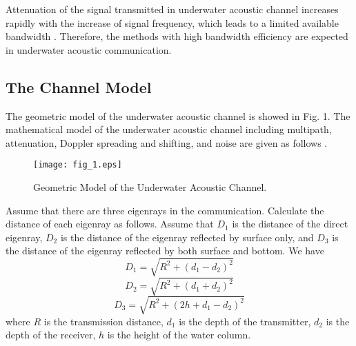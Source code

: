 \documentclass[journal]{IEEEtran}
\begin{document}
Attenuation of the signal transmitted in underwater acoustic channel
increases rapidly with the increase of signal frequency, which leads
to a limited available bandwidth \cite{Stojanovic2009}. Therefore,
the methods with high bandwidth efficiency are expected in
underwater acoustic communication.
\subsection{The Channel Model}
The geometric model of the underwater acoustic channel is showed in
Fig. 1. The mathematical model of the underwater acoustic channel
including multipath, attenuation, Doppler spreading and shifting,
and noise are given as follows \cite{Chitre2007}.
\begin{figure}[!t]
\centering
\texttt{[image: fig\_1.eps]}
\caption{Geometric Model of the Underwater Acoustic Channel.}
\label{fig_sim}
\end{figure}

Assume that there are three eigenrays in the communication.
Calculate the distance of each eigenray as follows. Assume that
${D_1}$ is the distance of the direct eigenray, ${D_2}$ is the
distance of the eigenray reflected by surface only, and ${D_3}$ is
the distance of the eigenray reflected by both surface and bottom.
We have
\begin{equation}
\label{eqn_example} {D_1} = \sqrt {{R^2} + {{({d_1} - {d_2})}^2}}
\end{equation}
\begin{equation}
\label{eqn_example} {D_2} = \sqrt {{R^2} + {{({d_1} + {d_2})}^2}}
\end{equation}
\begin{equation}
\label{eqn_example} {D_3} = \sqrt {{R^2} + {{(2h + {d_1} -
{d_2})}^2}}
\end{equation}
where $R$ is the transmission distance, ${d_1}$ is the depth of the
transmitter, ${d_2}$ is the depth of the receiver, $h$ is the height
of the water column.
\end{document}
